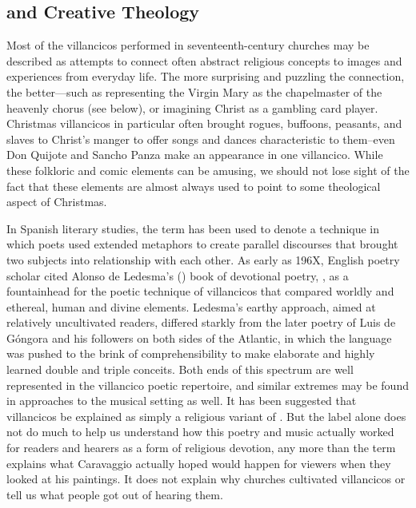 \subsection{ and Creative Theology}

Most of the villancicos performed in seventeenth-century churches may be
described as attempts to connect often abstract religious concepts to images
and experiences from everyday life.
The more surprising and puzzling the connection, the better---such as
representing the Virgin Mary as the chapelmaster of the heavenly chorus (see
below), or imagining Christ as a gambling card player.%
    \Autocite{Cashner:PlayingCards}
Christmas villancicos in particular often brought rogues, buffoons, peasants,
and slaves to Christ's manger to offer songs and dances characteristic to
them--even Don Quijote and Sancho Panza make an appearance in one villancico.%
While these folkloric and comic elements can be amusing, we should not lose
sight of the fact that these elements are almost always used to point to some
theological aspect of Christmas.

In Spanish literary studies, the term  has been used to
denote a technique in which poets used extended metaphors to create parallel
discourses that brought two subjects into relationship with each other.
As early as 196X\XXX[name], English poetry scholar \XXX[name] cited Alonso de
Ledesma's (\XXX[year]) book of devotional poetry, , as a fountainhead for the poetic technique of villancicos that
compared worldly and ethereal, human and divine elements.%
Ledesma's earthy approach, aimed at relatively uncultivated readers, differed
starkly from the later  poetry of Luis de Góngora and his
followers on both sides of the Atlantic, in which the language was pushed to
the brink of comprehensibility to make elaborate and highly learned double and
triple conceits.%
    \citXXX[Gongora]
Both ends of this spectrum are well represented in the villancico poetic
repertoire, and similar extremes may be found in approaches to the musical
setting as well.
It has been suggested that villancicos be explained as simply a religious
variant of .%
But the label  alone does not do much to help us understand
how this poetry and music actually worked for readers and hearers as a form of
religious devotion, any more than the term  explains what
Caravaggio actually hoped would happen for viewers when they looked at his
paintings.%
It does not explain why churches cultivated villancicos or tell us what people
got out of hearing them.

